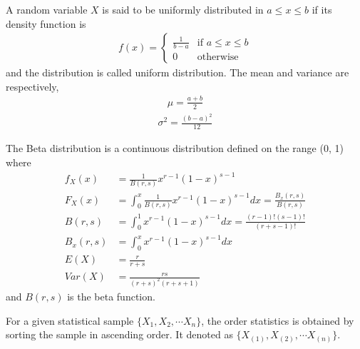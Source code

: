 \begin{theorem}
    A random variable $X$ is said to be uniformly distributed in $a\leq x\leq b$ if its density function is
    \begin{align}
        f(x)=
        \begin{cases}
        \frac{1}{b-a} & \text{if } a\leq x \leq b\\
        0 & \text{otherwise}
        \end{cases}\label{stats/8/eq:1}
    \end{align}
    and the distribution is called uniform distribution.
    The mean and variance are respectively,
    \begin{align}
        \mu=\frac{a+b}{2}\label{stats/8/eq:2}
    \end{align}
    \begin{align}
         \sigma^2=\frac{(b-a)^2}{12}\label{stats/8/eq:3}
    \end{align}
    \label{stats/8/theorem}
    \end{theorem}
    \begin{theorem}
    The Beta distribution is a continuous distribution defined on the range
    (0, 1) where 
    \begin{align}
      \label{stats/8/eq:4}  f_X(x)&=\frac{1}{B(r,s)}x^{r-1}(1-x)^{s-1}\\ 
        \label{stats/8/eq:5}F_X(x)&=\int_{0}^{x}\frac{1}{B(r,s)}x^{r-1}(1-x)^{s-1}dx=\frac{B_x(r,s)}{B(r,s)}\\ 
      \label{stats/8/eq:6}  B(r,s)&=\int_{0}^{1}x^{r-1}(1-x)^{s-1}dx=\frac{(r-1)!(s-1)!}{(r+s-1)!}\\ 
         \label{stats/8/eq:7}B_x(r,s)&=\int_{0}^{x}x^{r-1}(1-x)^{s-1}dx\\
       \label{stats/8/eq:8} E(X)&=\frac{r}{r+s}\\ 
        \label{stats/8/var} Var(X)&=\frac{rs}{(r+s)^{2}(r+s+1)} 
    \end{align}
    and $B(r,s)$ is the beta function. 
    \end{theorem}
    \begin{definition}
    For a given statistical sample $\{X_1, X_2,\cdots X_n\}$, the order statistics is obtained by sorting the sample in ascending order. It denoted as $\{X_{(1)}, X_{(2)},\cdots X_{(n)}\}$.
    \end{definition}
